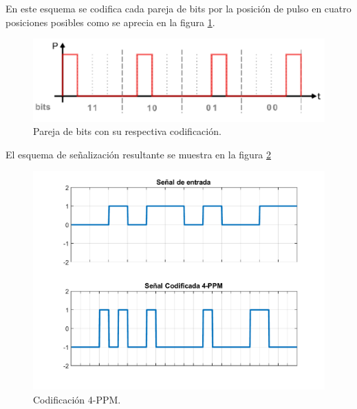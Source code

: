 En este esquema se codifica cada pareja de bits
por la posición de pulso en cuatro posiciones posibles como se aprecia en la figura
\ref{bits4ppm}.

\begin{figure}[ht]
    \centering
    \includegraphics[scale=0.5]{./figuras/opciones4PPM.png}%
    \caption{\small{Pareja de bits con su respectiva codificación.}}
    \label{bits4ppm}%
\end{figure}

El esquema de señalización resultante se muestra en la figura \ref{cod4ppm}
\begin{figure}[ht]
    \centering
    \includegraphics[scale=0.5]{./figuras/CodificadaPPM.pdf}%
    \caption{\small{Codificación 4-PPM.}}
    \label{cod4ppm}%
\end{figure}




